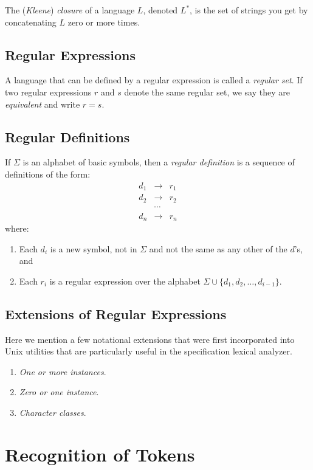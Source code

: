\documentclass[a4paper,twoside]{book}
\begin{document}
The (\textit{Kleene}) \textit{closure} of a language $L$, denoted $L^*$, is the set of strings you get by concatenating $L$ zero or more times.

\subsection{Regular Expressions}

A language that can be defined by a regular expression is called a \textit{regular set}. If two regular expressions $r$ and $s$ denote the same regular set, we say they are \textit{equivalent} and write $r=s$.

\subsection{Regular Definitions}

If $\Sigma$ is an alphabet of basic symbols, then a \textit{regular definition} is a sequence of definitions of the form: $$\begin{array}{ccc}d_1&\to&r_1\\d_2&\to&r_2\\&\cdots\\d_n&\to&r_n\end{array}$$ where:
\begin{enumerate}
    \item Each $d_i$ is a new symbol, not in $\Sigma$ and not the same as any other of the $d$'s, and
    \item Each $r_i$ is a regular expression over the alphabet $\Sigma\cup\{d_1,d_2,\ldots,d_{i-1}\}$.
\end{enumerate}

\subsection{Extensions of Regular Expressions}

Here we mention a few notational extensions that were first incorporated into Unix utilities that are particularly useful in the specification lexical analyzer.
\begin{enumerate}
    \item\textit{One or more instances}.
    \item\textit{Zero or one instance}.
    \item\textit{Character classes}.
\end{enumerate}

\section{Recognition of Tokens}
\end{document}
